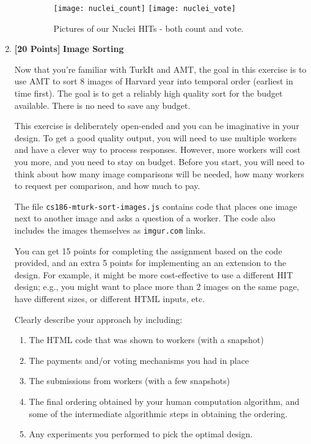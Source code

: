 \documentclass[11pt]{article}
\newcommand{\points}[1]{\textbf{[#1 Points]}}
\begin{document}
\begin{enumerate}
\begin{enumerate}
\begin{figure}[h]
\begin{center}
\texttt{[image: nuclei\_count]}
\texttt{[image: nuclei\_vote]}
\end{center}
\caption{Pictures of our Nuclei HITs - both count and vote.}
\end{figure}


\end{enumerate}

\item \points{20} {\bf Image Sorting}

Now that you're familiar with TurkIt and AMT, the goal in this
exercise is to use AMT to sort 8 images of Harvard year into temporal
order (earliest in time first). The goal is to get a reliably high
quality sort for the budget available. There is no need to save any
budget.

This exercise is deliberately open-ended and you can be imaginative in
your design. To get a good quality output, you will need to use
multiple workers and have a clever way to process responses. However,
more workers will cost you more, and you need to stay on budget.
Before you start, you will need to think about how many image
comparisons will be needed, how many workers to request per
comparison, and how much to pay.

The file \texttt{cs186-mturk-sort-images.js} contains code that places
one image next to another image and asks a question of a worker. The
code also includes the images themselves as {\tt imgur.com} links.

You can get 15 points for completing the assignment based on the code
provided, and an extra 5 points for implementing an an extension to
the design. 
%
For example, it might be more cost-effective to use a different HIT
design; e.g., you might want to place more than 2 images on the same
page, have different sizes, or different HTML inputs, etc.

Clearly describe your approach by including:
\begin{enumerate}
\item The HTML code that was shown to workers (with a snapshot)
\item The payments and/or voting mechanisms you had in place
\item The submissions from workers (with a few snapshots)
\item The final ordering obtained by your human computation
algorithm, and some of the intermediate algorithmic steps in obtaining
the ordering.
\item Any experiments you performed to pick the optimal design.
\end{enumerate}


\end{enumerate}
\end{document}
